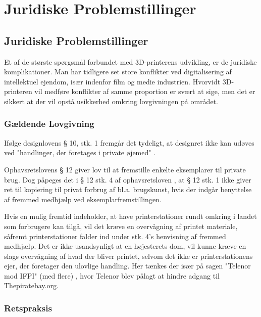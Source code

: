 \chapter{Juridiske Problemstillinger}

\section{Juridiske Problemstillinger}

Et af de største spørgsmål forbundet med 3D-printerens udvikling, er de juridiske komplikationer. Man har tidligere set store konflikter ved digitalisering af intellektuel ejendom, især indenfor film og medie industrien. Hvorvidt 3D-printeren vil medføre konflikter af samme proportion er svært at sige, men det er sikkert at der vil opstå usikkerhed omkring lovgivningen på området.

\subsection{Gældende Lovgivning}

Ifølge designlovens § 10, stk. 1 fremgår det tydeligt, at designret ikke kan udøves ved "handlinger, der foretages i private øjemed" \autocite{retsinformation.dk_designloven_2012}.

Ophavsretslovens § 12 giver lov til at fremstille enkelte eksemplarer til private brug.
Dog påpeges det i § 12 stk. 4 af ophavsretsloven \autocite{retsinformation.dk_ophavsretsloven_2010}, at § 12 stk. 1 ikke giver ret til kopiering til privat forbrug af bl.a. brugskunst, hvis der indgår benyttelse af fremmed medhjælp ved eksemplarfremstillingen.


Hvis en mulig fremtid indeholder, at have printerstationer rundt omkring i landet \autocite{bjorn_godske_dansk_2012} som forbrugere kan tilgå, vil det kræve en overvågning af printet materiale, såfremt printerstationer falder ind under stk. 4's henvisning af fremmed medhjælp. Det er ikke usandsynligt at en højesterets dom, vil kunne kræve en slags overvågning af hvad der bliver printet, selvom det ikke er printerstationens ejer, der foretager den ulovlige handling. Her tænkes der især på sagen "Telenor mod IFPI" (med flere) \autocite{domstol.dk_telenor_2010}, hvor Telenor blev pålagt at hindre adgang til Thepiratebay.org.

\subsection{Retspraksis}

